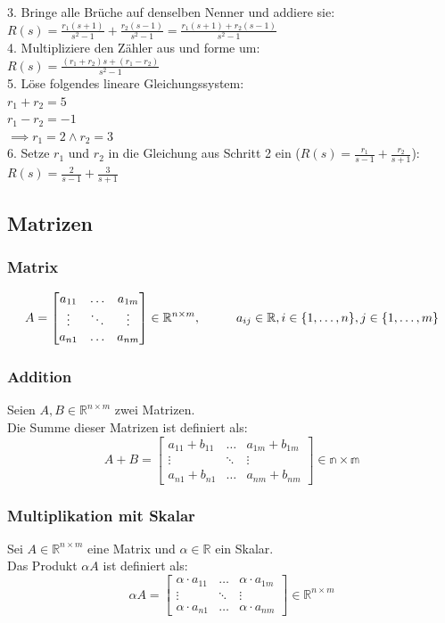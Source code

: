 \documentclass[10pt,a4paper]{article}
\newcommand{\tab}[1][1]{\hspace*{#1cm}}
\begin{document}
3. Bringe alle Brüche auf denselben Nenner und addiere sie: \\
$R(s) = \frac{r_1(s + 1)}{s^2-1} + \frac{r_2(s - 1)}{s^2-1} = \frac{r_1(s + 1) + r_2(s - 1)}{s^2-1}$\\

4. Multipliziere den Zähler aus und forme um: \\
$ R(s) = \frac{(r_1 + r_2)s + (r_1 - r_2)}{s^2-1}$ \\

5. Löse folgendes lineare Gleichungssystem: \\
$r_1 + r_2 = 5$ \\
$r_1 - r_2 = -1$ \\
$\implies r_1 = 2 \land r_2 = 3$ \\

6. Setze $r_1$ und $r_2$ in die Gleichung aus Schritt 2 ein ($R(s) = \frac {r_1} {s - 1} + \frac {r_2} {s + 1}$): \\
$R(s) = \frac {2} {s - 1} + \frac {3} {s + 1}$

\subsection{Matrizen}
\subsubsection{Matrix}
$$
	A = \begin{bmatrix}
		a_{11} & \dots & a_{1m} \\
		\vdots & \ddots & \vdots \\
		a_{n1} & \dots & a_{nm}
	\end{bmatrix} \in \mathbb{R}^{n \times m}, \tab a_{ij} \in \mathbb{R}, i \in \{1, \dots, n\}, j \in \{1, \dots, m\}
$$

\subsubsection{Addition}
Seien $A, B \in \mathbb{R}^{n \times m}$ zwei Matrizen. \\
Die Summe dieser Matrizen ist definiert als:
$$
	A + B = \begin{bmatrix}
	a_{11} + b_{11} & \dots & a_{1m} + b_{1m}\\
	\vdots & \ddots & \vdots \\
	a_{n1} + b_{n1} & \dots & a_{nm} + b_{nm}
	\end{bmatrix} \in \mathbb{n \times m}
$$

\subsubsection{Multiplikation mit Skalar}
Sei $A \in \mathbb{R}^{n \times m}$ eine Matrix und $\alpha \in \mathbb{R}$ ein Skalar. \\
Das Produkt $\alpha A$ ist definiert als:
$$
\alpha A = \begin{bmatrix}
\alpha ⋅ a_{11} & \dots & \alpha ⋅ a_{1m} \\
\vdots & \ddots & \vdots \\
\alpha ⋅ a_{n1} & \dots & \alpha ⋅ a_{nm}
\end{bmatrix} \in \mathbb{R}^{n \times m}
$$
\end{document}
